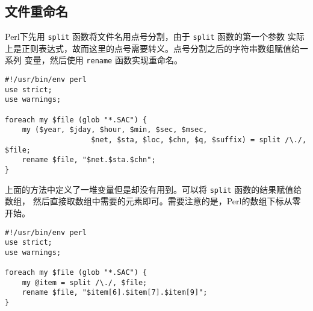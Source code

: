 \subsection{文件重命名}
\label{subsec:rename-in-perl}
Perl下先用 \texttt{split} 函数将文件名用点号分割，由于 \texttt{split} 函数的第一个参数
实际上是正则表达式，故而这里的点号需要转义。点号分割之后的字符串数组赋值给一系列
变量，然后使用 \texttt{rename} 函数实现重命名。
\begin{verbatim}
#!/usr/bin/env perl
use strict;
use warnings;

foreach my $file (glob "*.SAC") {
    my ($year, $jday, $hour, $min, $sec, $msec,
                    $net, $sta, $loc, $chn, $q, $suffix) = split /\./, $file;
    rename $file, "$net.$sta.$chn";
}
\end{verbatim}

上面的方法中定义了一堆变量但是却没有用到。可以将 \texttt{split} 函数的结果赋值给数组，
然后直接取数组中需要的元素即可。需要注意的是，Perl的数组下标从零开始。
\begin{verbatim}
#!/usr/bin/env perl
use strict;
use warnings;

foreach my $file (glob "*.SAC") {
    my @item = split /\./, $file;
    rename $file, "$item[6].$item[7].$item[9]";
}
\end{verbatim}
